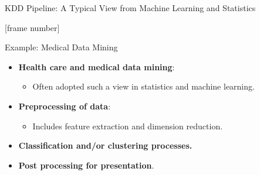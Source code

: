 \documentclass[aspectratio=169,t]{beamer}
\begin{document}
{\begin{frame}{KDD Pipeline: A Typical View from Machine Learning and Statistics}
    \end{frame}
  }

  {
    [frame number]
    \begin{frame}{Example: Medical Data Mining}
    \begin{itemize}
        \item \textbf{Health care and medical data mining}:
        \begin{itemize}
            \item Often adopted such a view in statistics and machine learning.
        \end{itemize}
        \item \textbf{Preprocessing of data}:
        \begin{itemize}
            \item Includes feature extraction and dimension reduction.
        \end{itemize}
        \item \textbf{Classification and/or clustering processes.}
        \item \textbf{Post processing for presentation}.
    \end{itemize}
    \end{frame}
  }
\end{document}
